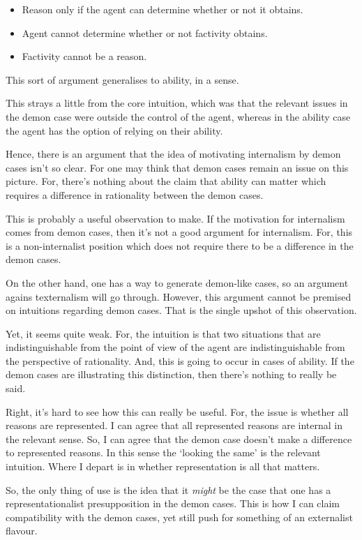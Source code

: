 \documentclass[10pt]{article}
\begin{document}
\begin{itemize}
\item Reason only if the agent can determine whether or not it obtains.
\item Agent cannot determine whether or not factivity obtains.
\item Factivity cannot be a reason.
\end{itemize}

This sort of argument generalises to ability, in a sense.

This strays a little from the core intuition, which was that the relevant issues in the demon case were outside the control of the agent, whereas in the ability case the agent has the option of relying on their ability.

Hence, there is an argument that the idea of motivating internalism by demon cases isn't so clear.
For one may think that demon cases remain an issue on this picture.
For, there's nothing about the claim that ability can matter which requires a difference in rationality between the demon cases.

This is probably a useful observation to make.
If the motivation for internalism comes from demon cases, then it's not a good argument for internalism.
For, this is a non-internalist position which does not require there to be a difference in the demon cases.

On the other hand, one has a way to generate demon-like cases, so an argument agains texternalism will go through.
However, this argument cannot be premised on intuitions regarding demon cases.
That is the single upshot of this observation.

Yet, it seems quite weak.
For, the intuition is that two situations that are indistinguishable from the point of view of the agent are indistinguishable from the perspective of rationality.
And, this is going to occur in cases of ability.
If the demon cases are illustrating this distinction, then there's nothing to really be said.

Right, it's hard to see how this can really be useful.
For, the issue is whether all reasons are represented.
I can agree that all represented reasons are internal in the relevant sense.
So, I can agree that the demon case doesn't make a difference to represented reasons.
In this sense the `looking the same' is the relevant intuition.
Where I depart is in whether representation is all that matters.

So, the only thing of use is the idea that it \emph{might} be the case that one has a representationalist presupposition in the demon cases.
This is how I can claim compatibility with the demon cases, yet still push for something of an externalist flavour.
\end{document}
